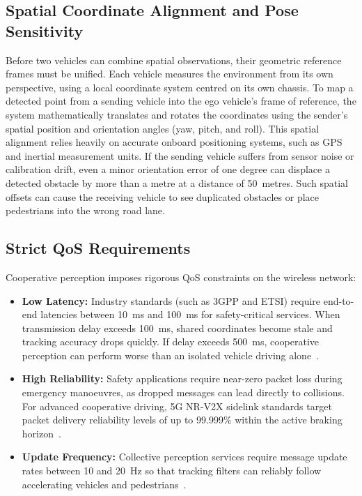 \subsection{Spatial Coordinate Alignment and Pose Sensitivity}
Before two vehicles can combine spatial observations, their geometric reference frames must be unified.
Each vehicle measures the environment from its own perspective, using a local coordinate system centred on its own chassis.
To map a detected point from a sending vehicle into the ego vehicle's frame of reference, the system mathematically translates and rotates the coordinates using the sender's spatial position and orientation angles (yaw, pitch, and roll).
This spatial alignment relies heavily on accurate onboard positioning systems, such as GPS and inertial measurement units.
If the sending vehicle suffers from sensor noise or calibration drift, even a minor orientation error of one degree can displace a detected obstacle by more than a metre at a distance of 50~metres.
Such spatial offsets can cause the receiving vehicle to see duplicated obstacles or place pedestrians into the wrong road lane.

\subsection{Strict QoS Requirements}
Cooperative perception imposes rigorous QoS constraints on the wireless network:
\begin{itemize}
    \item \textbf{Low Latency:} Industry standards (such as 3GPP and ETSI) require end-to-end latencies between 10~ms and 100~ms for safety-critical services.
    When transmission delay exceeds 100~ms, shared coordinates become stale and tracking accuracy drops quickly.
    If delay exceeds 500~ms, cooperative perception can perform worse than an isolated vehicle driving alone~\cite{guo2025autonomous}.
    \item \textbf{High Reliability:} Safety applications require near-zero packet loss during emergency manoeuvres, as dropped messages can lead directly to collisions.
    For advanced cooperative driving, 5G NR-V2X sidelink standards target packet delivery reliability levels of up to 99.999\% within the active braking horizon~\cite{castaneda2021tutorial,zhang2026cooperative}.
    \item \textbf{Update Frequency:} Collective perception services require message update rates between 10 and 20~Hz so that tracking filters can reliably follow accelerating vehicles and pedestrians~\cite{huang2025v2x,antonopoulos2026beyond}.
\end{itemize}


